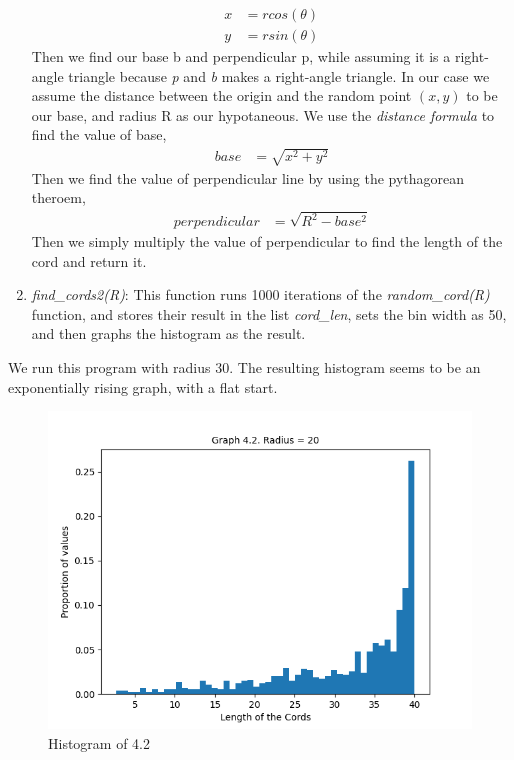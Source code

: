 \documentclass[answers]{exam}
\begin{document}
\begin{framed}
\begin{enumerate}
\begin{align*}
                    x &= rcos(\theta)\\
                    y &= rsin(\theta)
                \end{align*}
            Then we find our base b and perpendicular p, while assuming it is a right-angle triangle because \emph{p} and \emph{b} makes a right-angle triangle. In our case we assume the distance between the origin and the random point $(x,y)$ to be our base, and radius R as our hypotaneous. We use the \emph{distance formula} to find the value of base,\\
                \begin{align*}
                    base &= \sqrt{x^2+y^2}
                \end{align*}
            Then we find the value of perpendicular line by using the pythagorean theroem,\\
                \begin{align*}
                    perpendicular &= \sqrt{R^2-base^2}
                \end{align*}
            Then we simply multiply the value of perpendicular to find the length of the cord and return it.
            \item \emph{find\_cords2(R)}: This function runs 1000 iterations of the \emph{random\_cord(R)} function, and stores their result in the list \emph{cord\_len}, sets the bin width as 50, and then graphs the histogram as the result.
        \end{enumerate}
        We run this program with radius 30. The resulting histogram seems to be an exponentially rising graph, with a flat start.
    \end{framed}
    
    \begin{figure}[h]
        \caption{Histogram of 4.2}
        \centering
        \includegraphics[scale=0.7]{Q4/Q4(2).png}
    \end{figure}
\newpage
\end{document}

